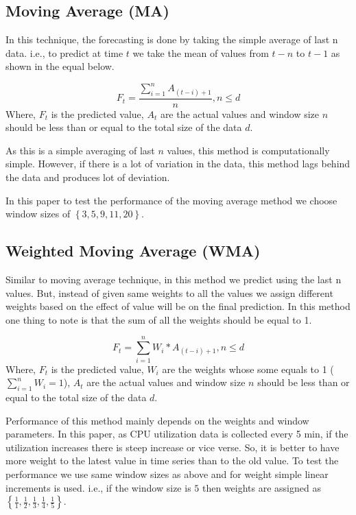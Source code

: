 \documentclass[conference,onecolumn]{IEEEtran}
\begin{document}
\subsection{Moving Average (MA)}
\label{subsec:MA}
In this technique, the forecasting is done by taking the simple average of last n data. i.e., to predict at time $t$ we take the mean of values from $t-n$ to $t-1$ as shown in the equal below.

\begin{equation}
F_t  =  \frac{\sum_{i=1}^{n} A_{(t-i)+1}}{n}, n\leq d
\end{equation}
Where, $F_t$ is the predicted value, $A_t$ are the actual values and window size $n$ should be less than or equal to the total size of the data $d$.

As this is a simple averaging of last $n$ values, this method is computationally simple. However, if there is a lot of variation in the data, this method lags behind the data and produces lot of deviation.

In this paper to test the performance of the moving average method we choose window sizes of $\left \{ 3, 5, 9, 11, 20\right \}$.

\subsection{Weighted Moving Average (WMA)}
\label{subsec:WMA}
Similar to moving average technique, in this method we predict using the last n values. But, instead of given same weights to all the values we assign different weights based on the effect of value will be on the final prediction. In this method one thing to note is that the sum of all the weights should be equal to 1.

\begin{equation}
F_t  =  \sum_{i=1}^{n} W_i * A_{(t-i)+1}, n\leq d
\end{equation}
Where, $F_t$ is the predicted value, $W_i$ are the weights whose some equals to 1 ($\sum_{i=1}^{n} W_i = 1$), $A_t$ are the actual values and window size $n$ should be less than or equal to the total size of the data $d$.

Performance of this method mainly depends on the weights and window parameters. In this paper, as CPU utilization data is collected every 5 min, if the utilization increases there is steep increase or vice verse. So, it is better to have more weight to the latest value in time series than to the old value. To test the performance we use same window sizes as above and for weight simple linear increments is used. i.e., if the window size is $5$ then weights are assigned as $\left \{ \frac{1}{1},\frac{1}{2},\frac{1}{3},\frac{1}{4},\frac{1}{5}\right \}$.
\end{document}
